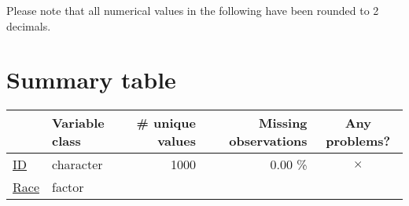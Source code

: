 \documentclass[]{report}
\begin{document}
Please note that all numerical values in the following have been rounded
to 2 decimals.

\chapter{Summary table}\label{summary-table}

\begin{longtable}[]{@{}llrrc@{}}
\toprule
\begin{minipage}[b]{0.16\columnwidth}\raggedright\strut
~\strut
\end{minipage} & \begin{minipage}[b]{0.16\columnwidth}\raggedright\strut
Variable class\strut
\end{minipage} & \begin{minipage}[b]{0.17\columnwidth}\raggedleft\strut
\# unique values\strut
\end{minipage} & \begin{minipage}[b]{0.22\columnwidth}\raggedleft\strut
Missing observations\strut
\end{minipage} & \begin{minipage}[b]{0.14\columnwidth}\centering\strut
Any problems?\strut
\end{minipage}\tabularnewline
\midrule
\endhead
\begin{minipage}[t]{0.16\columnwidth}\raggedright\strut
\protect\hyperlink{id}{ID}\strut
\end{minipage} & \begin{minipage}[t]{0.16\columnwidth}\raggedright\strut
character\strut
\end{minipage} & \begin{minipage}[t]{0.17\columnwidth}\raggedleft\strut
1000\strut
\end{minipage} & \begin{minipage}[t]{0.22\columnwidth}\raggedleft\strut
0.00 \%\strut
\end{minipage} & \begin{minipage}[t]{0.14\columnwidth}\centering\strut
\(\times\)\strut
\end{minipage}\tabularnewline
\begin{minipage}[t]{0.16\columnwidth}\raggedright\strut
\protect\hyperlink{race}{Race}\strut
\end{minipage} & \begin{minipage}[t]{0.16\columnwidth}\raggedright\strut
factor\strut
\end{minipage} & \begin{minipage}[t]{0.17\columnwidth}\raggedleft\strut

\end{minipage}
\end{longtable}
\end{document}
